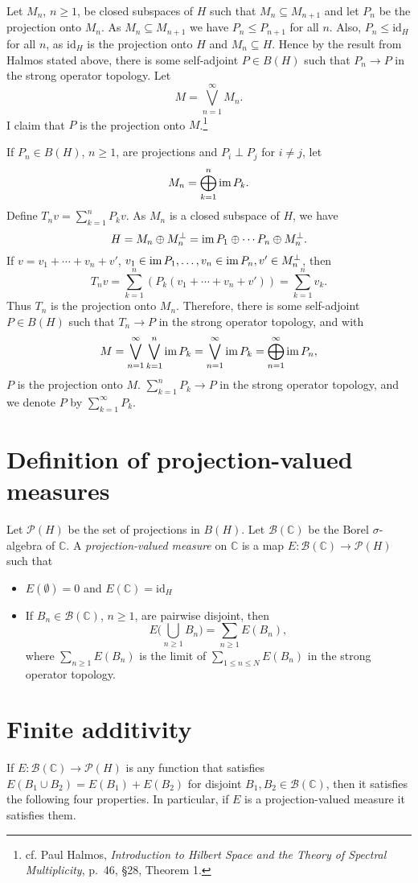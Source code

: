 \documentclass{article}
\newcommand{\im}{\textrm{im\,}}
\newcommand{\id}{\textrm{id}}
\begin{document}
Let $M_n$, $n \geq 1$, be closed subspaces of $H$ such that $M_n \subseteq M_{n+1}$ and let $P_n$ be the projection onto $M_n$. As $M_n \subseteq M_{n+1}$ we have $P_n \leq P_{n+1}$ for all $n$. Also,
$P_n \leq \id_H$ for all $n$, as $\id_H$ is the projection onto $H$ and $M_n \subseteq H$. Hence by the result from Halmos stated above, there is some self-adjoint $P \in B(H)$ such that
$P_n \to P$ in the strong operator topology. Let
\[
M=\bigvee_{n=1}^\infty M_n.
\]
I claim that $P$ is the projection onto $M$.\footnote{cf. Paul Halmos, {\em Introduction to Hilbert Space and the Theory of Spectral Multiplicity},
p.~46, \S 28, Theorem 1.}

If $P_n \in B(H)$, $n \geq 1$, are projections and $P_i \perp P_j$ for $i \neq j$, 
let 
\[
M_n = \bigoplus_{k=1}^n \im P_k.
\]
Define $T_n v=\sum_{k=1}^n P_k v$. As $M_n$ is a closed subspace of $H$, we have
\[
H=M_n \oplus M_n^\perp=\im P_1 \oplus \cdots P_n \oplus M_n^\perp.
\]
If $v =v_1+\cdots+v_n+v'$, $v_1 \in \im P_1,\ldots, v_n \in \im P_n, v' \in M_n^\perp$, then
\[
T_n v=\sum_{k=1}^n  \left(P_k (v_1+\cdots+v_n+v')\right)=\sum_{k=1}^n v_k.
\]
Thus $T_n$ is the projection onto $M_n$. Therefore, there is some self-adjoint $P \in B(H)$ such that
$T_n \to P$ in the strong operator topology, and with
\[
M=\bigvee_{n=1}^\infty \bigvee_{k=1}^n \im P_k = \bigvee_{n=1}^\infty \im P_k = \bigoplus_{n=1}^\infty \im P_n,
\]
$P$ is the projection onto $M$.
 $\sum_{k=1}^n P_k \to P$ in the strong operator topology, and we denote $P$
by $\sum_{k=1}^\infty P_k$.


\section{Definition  of projection-valued measures}
Let $\mathscr{P}(H)$ be the set of projections in $B(H)$. Let $\mathscr{B}(\mathbb{C})$ be the Borel $\sigma$-algebra of $\mathbb{C}$. A {\em projection-valued measure} on
$\mathbb{C}$ is a map $E:\mathscr{B}(\mathbb{C}) \to \mathscr{P}(H)$ 
such that
\begin{itemize}
\item $E(\emptyset)=0$ and $E(\mathbb{C})=\id_H$
\item If $B_n \in \mathscr{B}(\mathbb{C})$, $n \geq 1$, are pairwise disjoint, then
\[
E\Big(\bigcup_{n \geq 1} B_n\Big)=\sum_{n \geq 1} E(B_n),
\]
where $\sum_{n \geq 1} E(B_n)$ is the limit of $\sum_{1 \leq n \leq N} E(B_n)$ in the strong operator topology.
\end{itemize}

\section{Finite additivity}
\label{properties}
If $E:\mathscr{B}(\mathbb{C}) \to \mathscr{P}(H)$ is any function that satisfies
$E(B_1 \cup B_2)=E(B_1)+E(B_2)$ for disjoint $B_1, B_2 \in \mathscr{B}(\mathbb{C})$, then it satisfies the following
four properties. In particular, if $E$ is a projection-valued measure it satisfies them.
\end{document}
